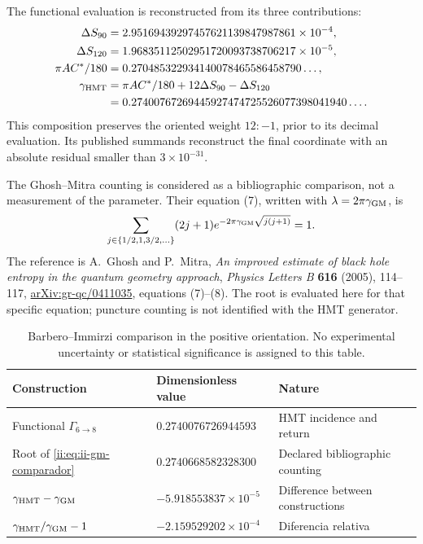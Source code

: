 The functional evaluation is reconstructed from its three contributions:
\begin{align*}
 \Delta S_{90}&=2.95169439297457621139847987861\times10^{-4},\\
 \Delta S_{120}&=1.96835112502951720093738706217\times10^{-5},\\
 \pi AC^*/180&=0.270485322934140078465586458790\ldots,\\
 \gamma_{\rm HMT}&=\pi AC^*/180+12\Delta S_{90}-\Delta S_{120}\\
 &=0.27400767269445927474725526077398041940\ldots.
\end{align*}
This composition preserves the oriented weight \(12:-1\), prior to its
decimal evaluation. Its published summands reconstruct the final
coordinate with an absolute residual smaller than \(3\times10^{-31}\).

The Ghosh--Mitra counting is considered as a bibliographic comparison,
not a measurement of the parameter. Their equation (7), written with
\(\lambda=2\pi\gamma_{\rm GM}\), is
\begin{equation}
 \sum_{j\in\{1/2,1,3/2,\ldots\}}(2j+1)
 e^{-2\pi\gamma_{\rm GM}\sqrt{j(j+1)}}=1.
 \label{ii:eq:ii-gm-comparador}
\end{equation}
The reference is A.~Ghosh and P.~Mitra,
\emph{An improved estimate of black hole entropy in the quantum geometry
approach}, \emph{Physics Letters B} \textbf{616} (2005), 114--117,
\href{https://arxiv.org/abs/gr-qc/0411035}{arXiv:gr-qc/0411035},
equations (7)--(8). The root is evaluated here for that specific equation;
puncture counting is not identified with the HMT generator.

\begin{table}[htbp]
\centering\small
\begin{tabular}{@{}lll@{}}
\toprule
Construction & Dimensionless value & Nature\\
\midrule
Functional \(\Gamma_{6\to8}\) & \(0.2740076726944593\) & HMT incidence and return\\
Root of \eqref{ii:eq:ii-gm-comparador} & \(0.2740668582328300\) & Declared bibliographic counting\\
\midrule
\(\gamma_{\rm HMT}-\gamma_{\rm GM}\) & \(-5.918553837\times10^{-5}\) & Difference between constructions\\
\(\gamma_{\rm HMT}/\gamma_{\rm GM}-1\) & \(-2.159529202\times10^{-4}\) & Diferencia relativa\\
\bottomrule
\end{tabular}
\caption{Barbero--Immirzi comparison in the positive orientation. No
experimental uncertainty or statistical significance is assigned to this table.}
\label{ii:tab:ii-barbero-comparacion}
\end{table}

